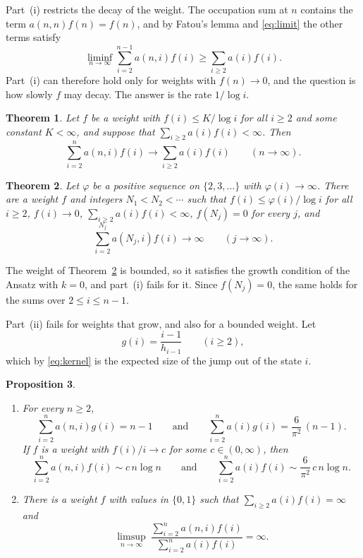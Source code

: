 \documentclass[11pt]{amsart}
\newtheorem{theorem}{Theorem}[section]
\newtheorem{proposition}[theorem]{Proposition}
\theoremstyle{remark}
\numberwithin{equation}{section}
\begin{document}
Part~(i) restricts the decay of the weight. The occupation sum at $n$ contains the term $a(n,n)f(n)=f(n)$, and by Fatou's
lemma and \eqref{eq:limit} the other terms satisfy
\[
\liminf_{n\to\infty}\sum_{i=2}^{n-1}a(n,i)f(i)\ge\sum_{i\ge2}a(i)f(i).
\]
Part~(i) can therefore hold only for weights with
$f(n)\to0$, and the question is how slowly $f$ may decay. The answer is the rate $1/\log i$.

\begin{theorem}\label{thm:conv}
Let $f$ be a weight with $f(i)\le K/\log i$ for all $i\ge2$ and some constant $K<\infty$, and suppose that
$\sum_{i\ge2}a(i)f(i)<\infty$. Then
\[
\sum_{i=2}^{n}a(n,i)f(i)\to\sum_{i\ge2}a(i)f(i)\qquad(n\to\infty).
\]
\end{theorem}

\begin{theorem}\label{thm:div}
Let $\varphi$ be a positive sequence on $\{2,3,\dots\}$ with $\varphi(i)\to\infty$. There are a weight $f$ and integers
$N_1<N_2<\cdots$ such that $f(i)\le\varphi(i)/\log i$ for all $i\ge2$, $f(i)\to0$, $\sum_{i\ge2}a(i)f(i)<\infty$,
$f(N_j)=0$ for every $j$, and
\[
\sum_{i=2}^{N_j}a(N_j,i)f(i)\to\infty\qquad(j\to\infty).
\]
\end{theorem}

The weight of Theorem~\ref{thm:div} is bounded, so it satisfies the growth condition of the Ansatz with $k=0$, and
part~(i) fails for it. Since $f(N_j)=0$, the same holds for the sums over $2\le i\le n-1$.

Part~(ii) fails for weights that grow, and also for a bounded weight. Let
\begin{equation}\label{eq:g}
g(i)=\frac{i-1}{h_{i-1}}\qquad(i\ge2),
\end{equation}
which by \eqref{eq:kernel} is the expected size of the jump out of the state $i$.

\begin{proposition}\label{prop:two}
\begin{enumerate}
\item[(a)] For every $n\ge2$,
\[
\sum_{i=2}^{n}a(n,i)g(i)=n-1\qquad\text{and}\qquad\sum_{i=2}^{n}a(i)g(i)=\frac{6}{\pi^2}\,(n-1).
\]
If $f$ is a weight with $f(i)/i\to c$ for some $c\in(0,\infty)$, then
\[
\sum_{i=2}^{n}a(n,i)f(i)\sim c\,n\log n\qquad\text{and}\qquad\sum_{i=2}^{n}a(i)f(i)\sim\frac{6}{\pi^2}\,c\,n\log n .
\]
\item[(b)] There is a weight $f$ with values in $\{0,1\}$ such that $\sum_{i\ge2}a(i)f(i)=\infty$ and
\[
\limsup_{n\to\infty}\ \frac{\sum_{i=2}^{n}a(n,i)f(i)}{\sum_{i=2}^{n}a(i)f(i)}=\infty .
\]
\end{enumerate}
\end{proposition}
\end{document}
